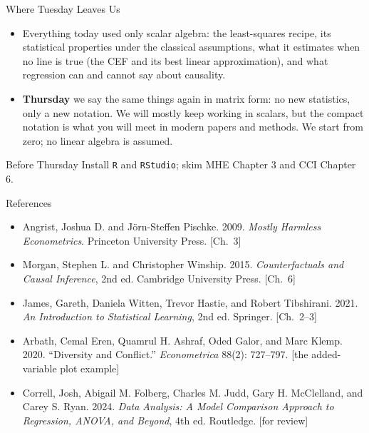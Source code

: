 \documentclass[aspectratio=169,11pt,xcolor=dvipsnames]{beamer}
\begin{document}
\begin{frame}{Where Tuesday Leaves Us}
\begin{itemize}\itemsep5pt
  \item Everything today used only scalar algebra: the least-squares recipe,
        its statistical properties under the classical assumptions, what it
        estimates when no line is true (the CEF and its best linear
        approximation), and what regression can and cannot say about causality.
  \item \textbf{Thursday} we say the same things again in \alert{matrix form}:
        no new statistics, only a new notation. We will mostly keep working in
        scalars, but the compact notation is what you will meet in modern
        papers and methods. We start from zero; no linear algebra is assumed.
\end{itemize}
\vskip6pt
\begin{block}{Before Thursday}
Install \texttt{R} and \texttt{RStudio}; skim MHE Chapter 3 and CCI Chapter 6.
\end{block}
\end{frame}

\begin{frame}[allowframebreaks,t]{References}
\footnotesize
\begin{itemize}\itemsep3pt
\item Angrist, Joshua D. and J\"orn-Steffen Pischke. 2009.
\textit{Mostly Harmless Econometrics}. Princeton University Press. [Ch.\ 3]
\item Morgan, Stephen L. and Christopher Winship. 2015.
\textit{Counterfactuals and Causal Inference}, 2nd ed. Cambridge University Press.
[Ch.\ 6]
\item James, Gareth, Daniela Witten, Trevor Hastie, and Robert Tibshirani. 2021.
\textit{An Introduction to Statistical Learning}, 2nd ed. Springer. [Ch.\ 2--3]
\item Arbatl{\i}, Cemal Eren, Quamrul H. Ashraf, Oded Galor, and Marc Klemp.
2020. ``Diversity and Conflict.'' \textit{Econometrica} 88(2): 727--797.
[the added-variable plot example]
\item Correll, Josh, Abigail M. Folberg, Charles M. Judd, Gary H. McClelland, and
Carey S. Ryan. 2024. \textit{Data Analysis: A Model Comparison Approach to
Regression, ANOVA, and Beyond}, 4th ed. Routledge. [for review]
\end{itemize}
\end{frame}
\end{document}
